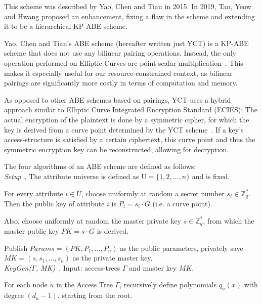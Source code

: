 This scheme was described by Yao, Chen and Tian \cite{yao_lightweight_2015} in 2015.
In 2019, Tan, Yeow and Hwang \cite{tan_enhancement_2019} proposed an enhancement, fixing a flaw in the scheme and extending it to be a hierarchical KP-ABE scheme. %

Yao, Chen and Tian's ABE scheme (hereafter written just YCT) is a KP-ABE scheme that does not use any bilinear pairing operations.
Instead, the only operation performed on Elliptic Curves are point-scalar multiplication~\cite{yao_lightweight_2015}.
This makes it especially useful for our resource-constrained context, as bilinear pairings are significantly more costly in terms of computation and memory.

As opposed to other ABE schemes based on pairings, YCT uses a hybrid approach similar to Elliptic Curve Integrated Encryption Standard (ECIES):
The actual encryption of the plaintext is done by a symmetric cipher, for which the key is derived from a curve point determined by the YCT scheme~\cite{yao_lightweight_2015}.
If a key's \gls{access-structure} is satisfied by a certain ciphertext, this curve point and thus the symmetric encryption key can be reconstructed, allowing for decryption.~\cite{yao_lightweight_2015}

The four algorithms of an ABE scheme are defined as follows: \\

\emph{Setup}~\cite{yao_lightweight_2015}.
The attribute universe is defined as $\text{U} = \{1, 2, \dots, n\}$ and is fixed.

For every attribute $i \in U$, choose uniformly at random a secret number $s_i \in \mathbb{Z}_q^*$. %
Then the public key of attribute $i$ is $P_i = s_i \cdot G$ (i.e. a curve point).

Also, choose uniformly at random the master private key $s \in \mathbb{Z}_q^*$, from which the master public key $PK = s \cdot G$ is derived.

Publish $Params=(PK, P_1, \dots, P_n)$ as the public parameters, privately save $MK = (s, s_1, \dots, s_n)$ as the private master key.
\\

\emph{KeyGen($\Gamma$, MK)}~\cite{yao_lightweight_2015}.
Input: \glspl{access-tree} $\Gamma$ and master key $MK$.

For each node $u$ in the Access Tree $\Gamma$, recursively define polynomials $q_u(x)$ with degree $(d_u - 1)$, starting from the root.

